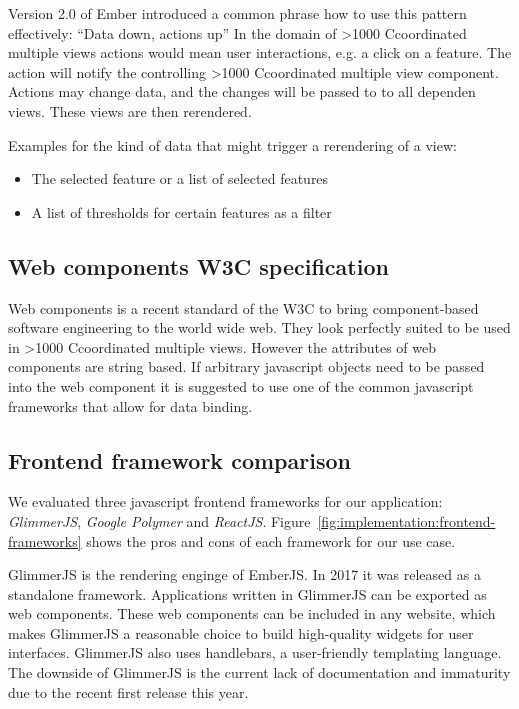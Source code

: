 \documentclass{article}
\newcommand\hmm[1]{\ifnum\ifhmode\spacefactor\else2000\fi>1000 \uppercase{#1}\else#1\fi}
\newcommand{\cmv}{\hmm{c}oordinated multiple view}
\newcommand{\cmvs}{\hmm{c}oordinated multiple views}
\begin{document}
Version 2.0 of Ember introduced a common phrase how to use this pattern effectively: ``Data down, actions up''\cite{Emberigniter2017}
In the domain of \cmvs{} actions would mean user interactions, e.g. a click on a feature.
The action will notify the controlling \cmv{} component.
Actions may change data, and the changes will be passed to to all dependen views.
These views are then rerendered.

Examples for the kind of data that might trigger a rerendering of a view:
\begin{itemize}
  \item
    The selected feature or a list of selected features
  \item
    A list of thresholds for certain features as a filter
\end{itemize}

\subsection{Web components W3C specification}

Web components is a recent standard of the W3C\cite{W3C2017} to bring component-based software engineering to the world wide web.
They look perfectly suited to be used in \cmvs{}.
However the attributes of web components are string based.
If arbitrary javascript objects need to be passed into the web component it is suggested to use one of the common javascript frameworks that allow for data binding.

\subsection{Frontend framework comparison}

We evaluated three javascript frontend frameworks for our application: \emph{GlimmerJS}, \emph{Google Polymer} and \emph{ReactJS}.
Figure~\ref{fig:implementation:frontend-frameworks} shows the pros and cons of each framework for our use case.

GlimmerJS is the rendering enginge of EmberJS\cite{Ember2017}.
In 2017 it was released as a standalone framework.
Applications written in GlimmerJS can be exported as web components.
These web components can be included in any website, which makes GlimmerJS a reasonable choice to build high-quality widgets for user interfaces.
GlimmerJS also uses handlebars\cite{Handlebars2017}, a user-friendly templating language.
The downside of GlimmerJS is the current lack of documentation and immaturity due to the recent first release this year.
\end{document}
